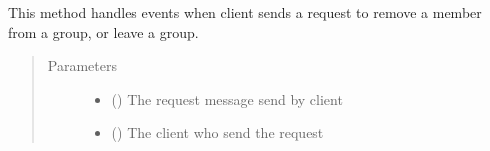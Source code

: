 \documentclass[letterpaper,10pt,english]{sphinxmanual}
\begin{document}

\begin{fulllineitems}
\label{\detokenize{serverHelper:serverHelper.removeMember}}
This method handles events when client sends a request to remove a member from a group, or leave a group.
\begin{quote}\begin{description}
\item[{Parameters}] \leavevmode\begin{itemize}
\item {} 
 () \textendash{} The request message send by client

\item {} 
 () \textendash{} The client who send the request

\end{itemize}

\end{description}\end{quote}

\end{fulllineitems}

\end{document}
